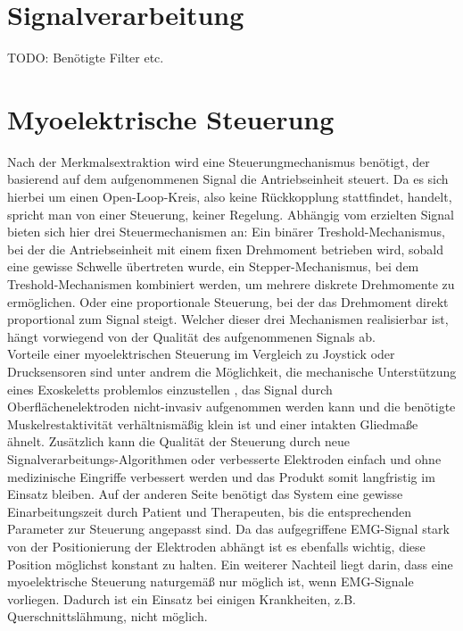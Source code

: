 \section{Signalverarbeitung}

TODO: Benötigte Filter etc. 

\section{Myoelektrische Steuerung}
Nach der Merkmalsextraktion wird eine Steuerungmechanismus benötigt, der basierend auf dem aufgenommenen Signal die Antriebseinheit steuert. Da es sich hierbei um einen Open-Loop-Kreis, also keine Rückkopplung stattfindet, handelt, spricht man von einer Steuerung, keiner Regelung. Abhängig vom erzielten Signal bieten sich hier drei Steuermechanismen an: Ein binärer Treshold-Mechanismus, bei der die Antriebseinheit mit einem fixen Drehmoment betrieben wird, sobald eine gewisse Schwelle übertreten wurde, ein Stepper-Mechanismus, bei dem Treshold-Mechanismen kombiniert werden, um mehrere diskrete Drehmomente zu ermöglichen. Oder eine proportionale Steuerung, bei der das Drehmoment direkt proportional zum Signal steigt. Welcher dieser drei Mechanismen realisierbar ist, hängt vorwiegend von der Qualität des aufgenommenen Signals ab. \\

Vorteile einer myoelektrischen Steuerung im Vergleich zu Joystick oder Drucksensoren sind unter andrem die Möglichkeit, die mechanische Unterstützung eines Exoskeletts problemlos einzustellen \citep{Ferris.2007},  das Signal durch Oberflächenelektroden nicht-invasiv aufgenommen werden kann und die benötigte Muskelrestaktivität verhältnismäßig klein ist \citep{Parker.2006} und einer intakten Gliedmaße ähnelt. Zusätzlich kann die Qualität der Steuerung durch neue Signalverarbeitungs-Algorithmen oder verbesserte Elektroden einfach und ohne medizinische Eingriffe verbessert werden und das Produkt somit langfristig im Einsatz bleiben. Auf der anderen Seite benötigt das System eine gewisse Einarbeitungszeit durch Patient und Therapeuten, bis die entsprechenden Parameter zur Steuerung angepasst sind. Da das aufgegriffene EMG-Signal stark von der Positionierung der Elektroden abhängt ist es ebenfalls wichtig, diese Position möglichst konstant zu halten. Ein weiterer Nachteil liegt darin, dass eine myoelektrische Steuerung naturgemäß nur möglich ist, wenn EMG-Signale vorliegen. Dadurch ist ein Einsatz bei einigen Krankheiten, z.B. Querschnittslähmung, nicht möglich. \\

